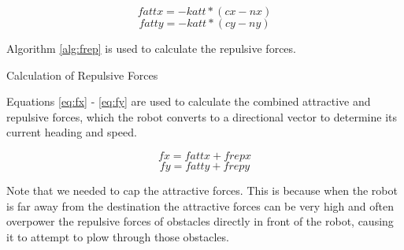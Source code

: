 \documentclass[12pt]{article}
\begin{document}
\begin{equation}
fattx = -katt * (cx - nx)
\label{eq:fattx}
\end{equation} 
\begin{equation}
fatty = -katt * (cy - ny)
\label{eq:fatty}
\end{equation} 


Algorithm \ref{alg:frep} is used to calculate the repulsive forces.

\begin{algorithm}[H]
\caption{Calculation of Repulsive Forces}
\label{alg:frep}
\begin{algorithmic}[1]

	\ENDIF
\ENDFOR

\end{algorithmic}
\end{algorithm}


Equations \ref{eq:fx} - \ref{eq:fy} are used to calculate the combined attractive and repulsive forces, which the robot converts to a directional vector to determine its current heading and speed.

\begin{equation}
fx = fattx + frepx
\label{eq:fx}
\end{equation} 
\begin{equation}
fy = fatty + frepy
\label{eq:fy}
\end{equation} 

Note that we needed to cap the attractive forces. This is because when the robot is far away from the destination the attractive forces can be very high and often overpower the repulsive forces of obstacles directly in front of the robot, causing it to attempt to plow through those obstacles.
\end{document}

